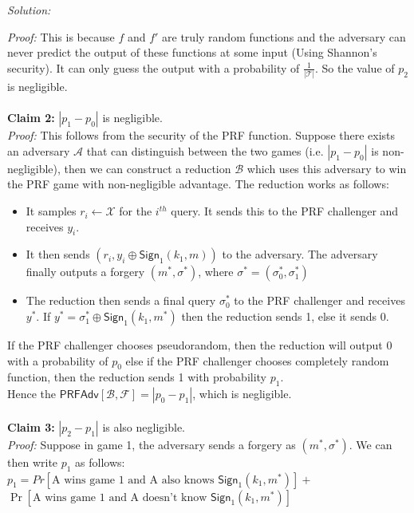 \documentclass[a4paper, 11pt]{article}
\newenvironment{solution}
    {\textit{Solution:}}
    {\clearpage}
\newcommand{\sign}{\mathsf{Sign}}
\newcommand{\calA}{\mathcal{A}}
\newcommand{\calB}{\mathcal{B}}
\newcommand{\calF}{\mathcal{F}}
\newcommand{\calX}{\mathcal{X}}
\newcommand{\calT}{\mathcal{T}}
\begin{document}
\begin{solution}
\begin{enumerate}[(a)]
              \textit{Proof:} This is because $f$ and $f'$ are truly random functions and the adversary can never predict the output of these functions at some input (Using Shannon's security). It can only guess the output with a probability of $\frac{1}{|\calT|}$. So the value of $p_2$ is negligible. \\ \\
              \textbf{Claim 2:} $|p_1 - p_0|$ is negligible. \\
              \textit{Proof:} This follows from the security of the PRF function. Suppose there exists an adversary $\calA$ that can distinguish between the two games (i.e. $|p_1 - p_0|$ is non-negligible), then we can construct a reduction $\calB$ which uses this adversary to win the PRF game with non-negligible advantage.
              The reduction works as follows:
              \begin{itemize}
                  \item It samples $r_i \leftarrow \calX$ for the $i^{th}$ query. It sends this to the PRF challenger and receives $y_i$.
                  \item It then sends $(r_i, y_i \oplus \sign_1(k_1, m))$ to the adversary. The adversary finally outputs a forgery $(m^*, \sigma^*)$, where $\sigma^* = (\sigma^*_0, \sigma^*_1)$
                  \item The reduction then sends a final query $\sigma^*_0$ to the PRF challenger and receives $y^*$. If $y^* = \sigma^*_1 \oplus \sign_1(k_1, m^*)$ then the reduction sends 1, else it sends 0.
              \end{itemize}
              If the PRF challenger chooses pseudorandom, then the reduction will output 0 with a probability of $p_0$ else if the PRF challenger chooses completely random function, then the reduction sends 1 with probability $p_1$.\\
              Hence the $\mathsf{PRFAdv}[\calB, \calF] = |p_0 - p_1|$, which is negligible.
              \\ \\
              \textbf{Claim 3:} $|p_2 - p_1|$ is also negligible. \\
              \textit{Proof:} Suppose in game 1, the adversary sends a forgery as $(m^*, \sigma^*)$. We can then write $p_1$ as follows: \\
              $p_1 = Pr[\text{A wins game 1 and A also knows $\sign_1(k_1, m^*)$}] +$ \\
              $\Pr[\text{A wins game 1 and A doesn't know $\sign_1(k_1, m^*)$}]$

\end{enumerate}
\end{solution}
\end{document}

